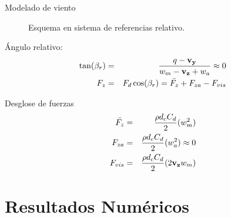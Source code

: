 \documentclass[
  aspectratio=169,
]{beamer}
\begin{document}
\begin{small}
\begin{frame}{Modelado de viento}
	\begin{minipage}[t]{0.48\linewidth}
		\begin{figure}[htbp]
			\centering
			\def\svgwidth{60mm}
			
			\caption{Esquema en sistema de referencias relativo.}
		\end{figure}
	\end{minipage}\hfill
	\begin{minipage}[t]{0.48\linewidth}
		\vspace{-1.3cm}
		\begin{block}{Ángulo relativo:}
			\begin{eqnarray}
				\tan (\beta_r) &=& \frac{q-\bf{v_y}}{w_m - \bf{v}_{z} + \text{$w_a$}} \approx 0 \\
			F_z &=& F_d \cos(\beta_r)=\bar{F_z}+F_{za}-F_{vis}
			\end{eqnarray}
		\end{block}
		\begin{block}{Desglose de fuerzas}
				\begin{eqnarray}
					\bar{F_z} &=&  \frac{\rho d_c C_d}{2} (w_m^2)\\
					F_{za} &=&  \frac{\rho d_c C_d}{2} (w_a^2)\approx 0\\
					F_{vis}  &=& \frac{\rho d_c C_d}{2} (2 \text{$\bf{v_{z}}$} w_m)
				\end{eqnarray}  
		\end{block}
	\end{minipage}
\end{frame}
 \section[Resultados Numéricos]{Resultados Numéricos}

\end{small}
\end{document}
